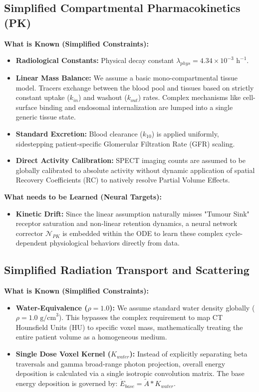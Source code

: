 \documentclass[11pt,a4paper]{article}
\begin{document}
\subsection{Simplified Compartmental Pharmacokinetics (PK)}
\textbf{What is Known (Simplified Constraints):}
\begin{itemize}
    \item \textbf{Radiological Constants:} Physical decay constant $\lambda_{phys} = 4.34 \times 10^{-3} \text{ h}^{-1}$.
    \item \textbf{Linear Mass Balance:} We assume a basic mono-compartmental tissue model. Tracers exchange between the blood pool and tissues based on strictly constant uptake ($k_{in}$) and washout ($k_{out}$) rates. Complex mechanisms like cell-surface binding and endosomal internalization are lumped into a single generic tissue state.
    \item \textbf{Standard Excretion:} Blood clearance ($k_{10}$) is applied uniformly, sidestepping patient-specific Glomerular Filtration Rate (GFR) scaling.
    \item \textbf{Direct Activity Calibration:} SPECT imaging counts are assumed to be globally calibrated to absolute activity without dynamic application of spatial Recovery Coefficients (RC) to natively resolve Partial Volume Effects.
\end{itemize}

\textbf{What needs to be Learned (Neural Targets):}
\begin{itemize}
    \item \textbf{Kinetic Drift:} Since the linear assumption naturally misses "Tumour Sink" receptor saturation and non-linear retention dynamics, a neural network corrector $\mathcal{N}_{PK}$ is embedded within the ODE to learn these complex cycle-dependent physiological behaviors directly from data.
\end{itemize}

\subsection{Simplified Radiation Transport and Scattering}
\textbf{What is Known (Simplified Constraints):}
\begin{itemize}
    \item \textbf{Water-Equivalence ($\rho = 1.0$):} We assume standard water density globally ($\rho = 1.0 \text{ g/cm}^3$). This bypasses the complex requirement to map CT Hounsfield Units (HU) to specific voxel mass, mathematically treating the entire patient volume as a homogeneous medium.
    \item \textbf{Single Dose Voxel Kernel ($K_{water}$):} Instead of explicitly separating beta traversals and gamma broad-range photon projection, overall energy deposition is calculated via a single isotropic convolution matrix. The base energy deposition is governed by: $\dot{E}_{base} = \tilde{A} \ast K_{water}$.
\end{itemize}
\end{document}
